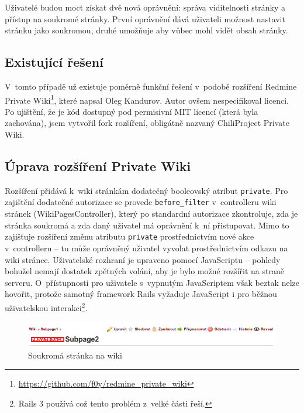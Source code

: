 \documentclass[thesis=B,czech]{FITthesis}[2012/05/02]
\begin{document}
Uživatelé budou moct získat dvě nová oprávnění: správa viditelnosti
stránky a přístup na soukromé stránky. První oprávnění dává uživateli
možnost nastavit stránku jako soukromou, druhé umožňuje aby vůbec mohl
vidět obsah stránky.

\subsection{Existující řešení}

V~tomto případě už existuje poměrně funkční řešení v~podobě rozšíření
Redmine Private Wiki\footnote{\url{https://github.com/f0y/redmine_private_wiki}},
které napsal Oleg Kandurov. Autor ovšem nespecifikoval licenci. Po
ujištění, že je kód dostupný pod permisivní MIT licencí (která byla
zachována), jsem vytvořil \gls{fork} rozšíření, obligátně nazvaný
ChiliProject Private Wiki.

\subsection{Úprava rozšíření Private Wiki}

Rozšíření přidává k~wiki stránkám dodatečný booleovský atribut
\lstinline!private!. Pro zajištění dodatečné autorizace se provede
\lstinline!before_filter! v~controlleru wiki stránek
(WikiPagesController), který po standardní autorizace zkontroluje, zda je
stránka soukromá a zda daný uživatel má oprávnění k~ní přistupovat. Mimo
to zajišťuje rozšíření změnu atributu \lstinline!private!
prostřednictvím nové akce v~controlleru -- tu může oprávněný uživatel
vyvolat prostřednictvím odkazu na wiki stránce. Uživatelské rozhraní je
upraveno pomocí JavaScriptu -- pohledy bohužel nemají dostatek zpětných
volání, aby je bylo možné rozšířit na straně serveru. O~přístupnosti pro
uživatele s~vypnutým JavaScriptem však beztak nelze hovořit, protože
samotný framework Rails vyžaduje JavaScript i pro běžnou uživatelskou
interakci\footnote{Rails 3 používá 
  což tento problém z~velké části řeší.}.

\begin{figure}[tbp]
\centering
\centerline{\includegraphics[width=1.2\textwidth]{wiki-gui1.png}}
\caption{Soukromá stránka na wiki}
\label{fig:GUIPrivateWiki}
\end{figure}
\end{document}
